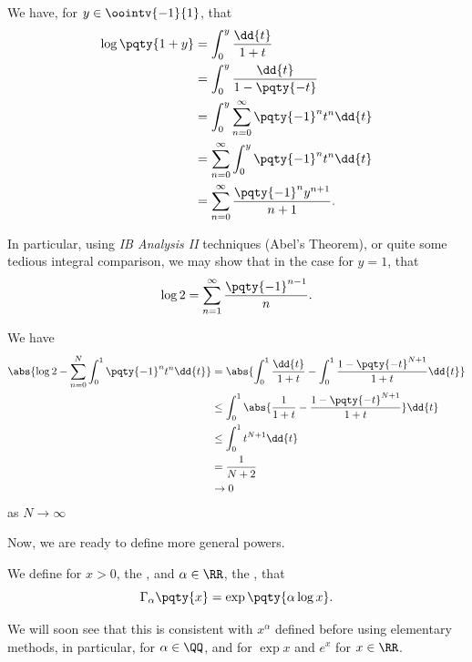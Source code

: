 \begin{remark}
    We have, for \(y \in \oointv{-1}{1}\), that
    \begin{align*}
        \log\pqty{1 + y} &= \int_0^y \frac{\dd{t}}{1 + t} \\
        &= \int_0^y \frac{\dd{t}}{1 - \pqty{-t}} \\
        &= \int_0^y \sum_{n = 0}^{\infty} \pqty{-1}^n t^n \dd{t} \\
        &= \sum_{n = 0}^{\infty} \int_0^y \pqty{-1}^n t^n \dd{t} \\
        &= \sum_{n = 0}^{\infty} \frac{\pqty{-1}^{n} y^{n + 1}}{n + 1}.
    \end{align*}

    In particular, using \textit{IB Analysis II} techniques (Abel's Theorem), or quite some tedious integral comparison, we may show that in the case for \(y = 1\), that
    \[
        \log 2 = \sum_{n = 1}^{\infty} \frac{\pqty{-1}^{n - 1}}{n}.
    \]

    We have
    \begin{align*}
        \abs{\log 2 - \sum_{n = 0}^{N} \int_{0}^{1} \pqty{-1}^n t^n \dd{t}} &= \abs{\int_{0}^{1} \frac{\dd{t}}{1 + t} - \int_{0}^{1} \frac{1 - \pqty{-t}^{N + 1}}{1 + t} \dd{t}} \\
        &\leq \int_{0}^{1} \abs{\frac{1}{1 + t} - \frac{1 - \pqty{-t}^{N + 1}}{1 + t}} \dd{t} \\
        &\leq \int_{0}^{1} t^{N + 1} \dd{t} \\
        &= \frac{1}{N + 2} \\
        &\to 0
    \end{align*}
    as \(N \to \infty\)
\end{remark}

Now, we are ready to define more general powers.

\begin{definition}[Powers]
    \label{def:general-powers}%
    We define for \(x > 0\), the , and \(\alpha \in \RR\), the , that
    \[
        \Gamma_{\alpha} \pqty{x} = \exp \pqty{\alpha \log x}.
    \]
\end{definition}

\begin{remark}
    We will soon see that this is consistent with \(x^\alpha\) defined before using elementary methods, in particular, for \(\alpha \in \QQ\), and for \(\exp x\) and \(e^x\) for \(x \in \RR\).
\end{remark}

